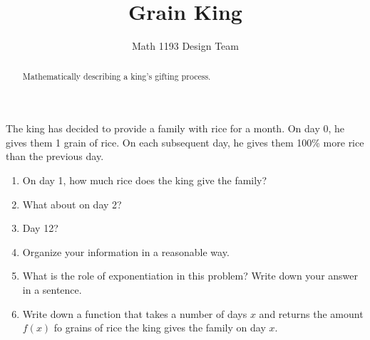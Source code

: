 \documentclass[noauthor,noinstructornotes]{ximera}
\title{Grain King}
\author{Math 1193 Design Team}
\begin{document}
\begin{abstract}
    Mathematically describing a king's gifting process.
\end{abstract}
\maketitle

The king has decided to provide a family with rice for a month. 
On day 0, he gives them 1 grain of rice. On each subsequent day, 
he gives them 100\% more rice than the previous day. 

\begin{enumerate}
    \item On day 1, how much rice does the king give the family?
    \item What about on day 2?
    \item Day 12?
    \item Organize your information in a reasonable way.
    \item What is the role of exponentiation in this problem? Write down
    your answer in a sentence.
    \item Write down a function that takes a number of days \(x\)
    and returns the amount \(f(x)\) fo grains of rice the king gives the
    family on day \(x\).
\end{enumerate}
\end{document}
